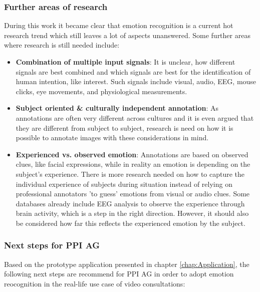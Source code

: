 \subsubsection{Further areas of research}
During this work it became clear that emotion recognition is a current hot research trend which still leaves a lot of aspects unanswered. Some further areas where research is still needed include:
\begin{itemize}
    \item \textbf{Combination of multiple input signals}: It is unclear, how different signals are best combined and which signals are best for the identification of human intention, like interest. Such signals include visual, audio, EEG, mouse clicks, eye movements, and physiological measurements.
    \item \textbf{Subject oriented \& culturally independent annotation}: As annotations are often very different across cultures and it is even argued that they are different from subject to subject, research is need on how it is possible to annotate images with these considerations in mind. 
    \item \textbf{Experienced vs. observed emotion}: Annotations are based on observed clues, like facial expressions, while in reality an emotion is depending on the subject's experience. There is more research needed on how to capture the individual experience of subjects during situation instead of relying on professional annotators 'to guess' emotions from visual or audio clues. Some databases already include EEG analysis to observe the experience through brain activity, which is a step in the right direction. However, it should also be considered how far this reflects the experienced emotion by the subject.
\end{itemize}



\subsubsection{Next steps for PPI AG}
Based on the prototype application presented in chapter \ref{chap:Application}, the following next steps are recommend for PPI AG in order to adopt emotion reocognition in the real-life use case of video consultations:

